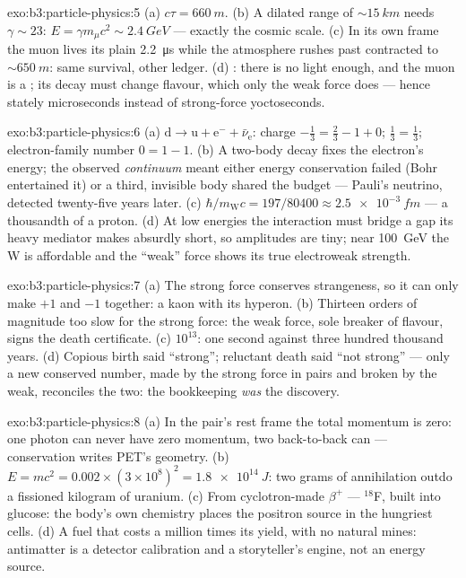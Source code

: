 \begin{solution}{exo:b3:particle-physics:5}
(a) $c\tau = \qty{660}{m}$. (b) A dilated range of
${\sim}\qty{15}{km}$ needs $\gamma \sim 23$: $E = \gamma
m_\mu c^2 \sim \qty{2.4}{GeV}$ --- exactly the cosmic scale. (c)
In its own frame the muon lives its plain \qty{2.2}{\micro s}
while the atmosphere rushes past contracted to
${\sim}\qty{650}{m}$: same survival, other ledger. (d) : there is no  light enough, and the muon is a
; its decay must change flavour, which only the weak force
does --- hence stately microseconds instead of strong-force
yoctoseconds.
\end{solution}

\begin{solution}{exo:b3:particle-physics:6}
(a) $\text{d} \to \text{u} + \text{e}^- + \bar\nu_{\text{e}}$:
charge $-\tfrac13 = \tfrac23 - 1 + 0$; 
$\tfrac13 = \tfrac13$; electron-family number $0 = 1 - 1$. (b) A
two-body decay fixes the electron's energy; the observed
\emph{continuum} meant either energy conservation failed
(Bohr entertained it) or a third, invisible body shared the
budget --- Pauli's neutrino, detected twenty-five years later.
(c) $\hbar/m_{\text{W}}c = 197/80400 \approx
\qty{2.5e-3}{fm}$ --- a thousandth of a proton. (d) At low
energies the interaction must bridge a gap its heavy mediator
makes absurdly short, so amplitudes are tiny; near
\qty{100}{GeV} the W is affordable and the ``weak'' force shows
its true electroweak strength.
\end{solution}

\begin{solution}{exo:b3:particle-physics:7}
(a) The strong force conserves strangeness, so it can only make
$+1$ and $-1$ together: a kaon with its hyperon. (b) Thirteen
orders of magnitude too slow for the strong force: the weak
force, sole breaker of flavour, signs the death certificate.
(c) $10^{13}$: one second against three hundred thousand years.
(d) Copious birth said ``strong''; reluctant death said ``not
strong'' --- only a new conserved number, made by the strong
force in pairs and broken by the weak, reconciles the two: the
bookkeeping \emph{was} the discovery.
\end{solution}

\begin{solution}{exo:b3:particle-physics:8}
(a) In the pair's rest frame the total momentum is zero: one
photon can never have zero momentum, two back-to-back can ---
conservation writes PET's geometry. (b) $E = mc^2 =
0.002\times(3\times10^8)^2 = \qty{1.8e14}{J}$: two grams of
annihilation outdo a fissioned kilogram of uranium. (c) From
cyclotron-made $\beta^+$  --- $^{18}$F, built into
glucose: the body's own chemistry places the positron source in
the hungriest cells. (d) A fuel that costs a million times its
yield, with no natural mines: antimatter is a detector
calibration and a storyteller's engine, not an energy source.
\end{solution}

